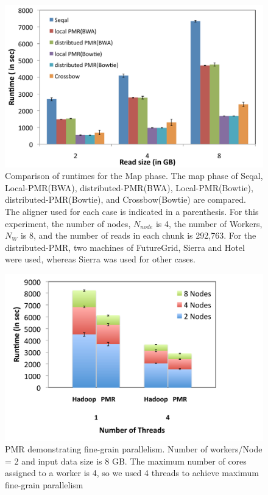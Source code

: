 \documentclass{acm_proc_article-sp}
\begin{document}
\begin{figure} 
 \centering
\includegraphics[scale=0.40]{figures/map_comp.pdf}
\caption{\small  Comparison of runtimes for the Map phase. The map phase of Seqal, Local-PMR(BWA), distributed-PMR(BWA), Local-PMR(Bowtie), distributed-PMR(Bowtie), and Crossbow(Bowtie) are compared.  The aligner used for each case is indicated in a parenthesis.  For this experiment, the number of nodes, $N_{node}$ is 4, the number of Workers, $N_W$ is 8, and the number of reads in each chunk is 292,763.  For the distributed-PMR, two machines of FutureGrid, Sierra and Hotel were used, whereas Sierra was used for other cases.}
  \label{fig:tool_comp} 
\end{figure}

\begin{figure} 
 \centering
\includegraphics[scale=0.46]{figures/fig6_t.pdf}
\caption{\small PMR demonstrating fine-grain parallelism.  Number of workers/Node = 2 and input data size is 8 GB. The maximum number of cores assigned to a worker is 4, so we used 4 threads to achieve maximum fine-grain parallelism}
  \label{fig:mulit-parallel} 
\end{figure}
\end{document}
